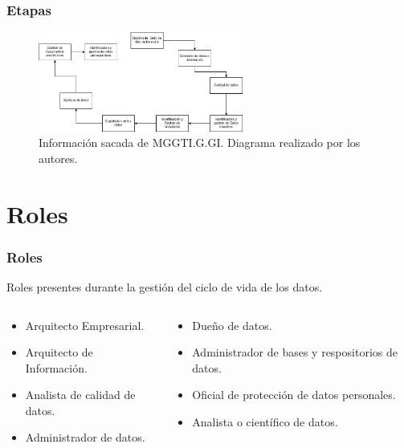 \begin{frame}[allowframebreaks]

  \frametitle{Etapas}

  
  \begin{figure}[ht]
    \centering
    \includegraphics[width=0.6\textwidth]{img/Etapas.png}
    \caption{Información sacada de MGGTI.G.GI\cite{MinTIC2021}. Diagrama realizado por los autores.}
  \end{figure}

  


\end{frame}

\section{Roles}

\insertsectionpage

\begin{frame}[allowframebreaks]

  \frametitle{Roles}

  Roles presentes durante la gestión del ciclo de vida de los datos.\cite{MinTIC2021}

\begin{columns}
  \begin{column}{.5\textwidth}
    \begin{itemize}
      \item Arquitecto Empresarial.
      \item Arquitecto de Información.
      \item Analista de calidad de datos.
      \item Administrador de datos.
    \end{itemize}
  \end{column}

  \begin{column}{.5\textwidth}
    \begin{itemize}
      \item Dueño de datos.
      \item Administrador de bases y respositorios de datos.
      \item Oficial de protección de datos personales.
      \item Analista o científico de datos.
    \end{itemize}
  \end{column}


\end{columns}


\end{frame}




  


